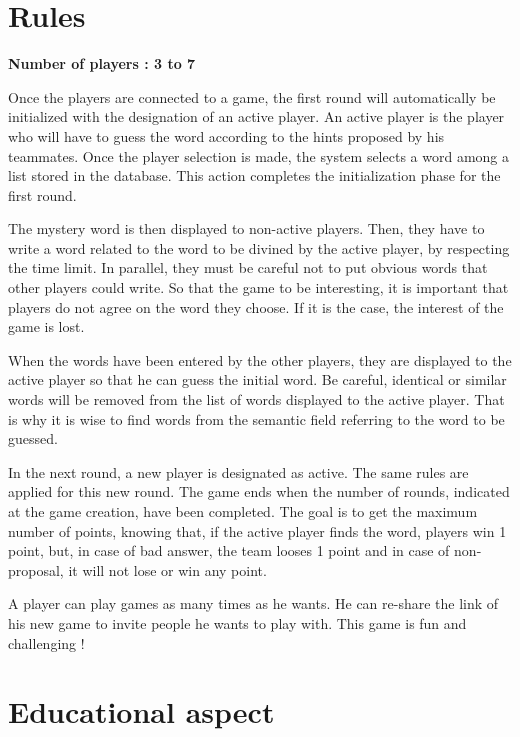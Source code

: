 \documentclass{tnreport}
\begin{document}
\clearpage

\section{Rules}

\label{chapter:rules}

\textbf{Number of players : 3 to 7}

Once the players are connected to a game, the first round will automatically be initialized with the designation of an active player. An active player is the player who will have to guess the word according to the hints proposed by his teammates. Once the player selection is made, the system selects a word among a list stored in the database. This action completes the initialization phase for the first round. 

The mystery word is then displayed to non-active players. Then, they have to write a word related to the word to be divined by the active player, by respecting the time limit. In parallel, they must be careful not to put obvious words that other players could write. So that the game to be interesting, it is important that players do not agree on the word they choose. If it is the case, the interest of the game is lost. 

When the words have been entered by the other players, they are displayed to the active player so that he can guess the initial word. Be careful, identical or similar words will be removed from the list of words displayed to the active player. That is why it is wise to find words from the semantic field referring to the word to be guessed. 

In the next round, a new player is designated as active. The same rules are applied for this new round. The game ends when the number of rounds, indicated at the game creation, have been completed. The goal is to get the maximum number of points, knowing that, if the active player finds the word, players win 1 point, but, in case of bad answer, the team looses 1 point and in case of non-proposal, it will not lose or win any point. 

A player can play games as many times as he wants. He can re-share the link of his new game to invite people he wants to play with. This game is fun and challenging !

\section{Educational aspect}
\end{document}
